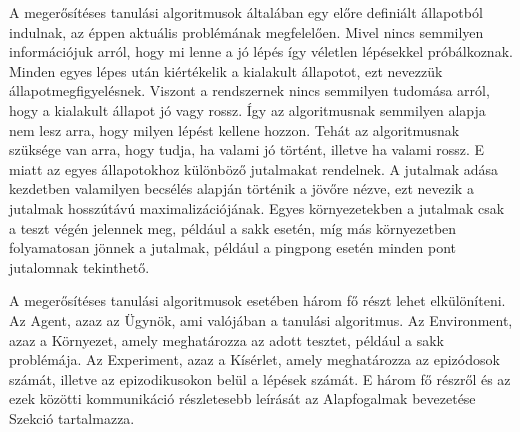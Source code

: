 A megerősítéses tanulási algoritmusok általában egy előre definiált állapotból indulnak, az éppen aktuális problémának megfelelően. Mivel nincs semmilyen információjuk arról, hogy mi lenne a jó lépés így véletlen lépésekkel próbálkoznak. Minden egyes lépes után kiértékelik a kialakult állapotot, ezt nevezzük állapotmegfigyelésnek. Viszont a rendszernek nincs semmilyen tudomása arról, hogy a kialakult állapot jó vagy rossz. Így az algoritmusnak semmilyen alapja nem lesz arra, hogy milyen lépést kellene hozzon. Tehát az algoritmusnak szüksége van arra, hogy tudja, ha valami jó történt, illetve ha valami rossz. E miatt az egyes állapotokhoz különböző jutalmakat rendelnek. A jutalmak adása kezdetben valamilyen becsélés alapján történik a jövőre nézve, ezt nevezik a jutalmak hosszútávú maximalizációjának. Egyes környezetekben a jutalmak csak a teszt végén jelennek meg, például a sakk esetén, míg más környezetben folyamatosan jönnek a jutalmak, például a pingpong esetén minden pont jutalomnak tekinthető.

A megerősítéses tanulási algoritmusok esetében három fő részt lehet elkülöníteni. Az Agent, azaz az Ügynök, ami valójában a tanulási algoritmus. Az Environment, azaz a Környezet, amely meghatározza az adott tesztet, például a sakk problémája. Az Experiment, azaz a Kísérlet, amely meghatározza az epizódosok számát, illetve az epizodikusokon belül a lépések számát. E három fő részről és az ezek közötti kommunikáció részletesebb leírását az Alapfogalmak bevezetése Szekció tartalmazza.



